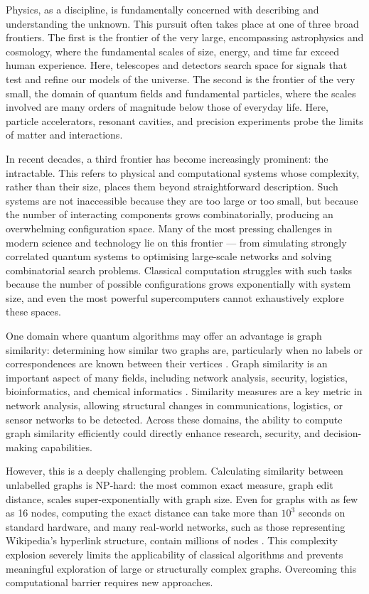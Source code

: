 Physics, as a discipline, is fundamentally concerned with describing and understanding the unknown. This pursuit often takes place at one of three broad frontiers. The first is the frontier of the very large, encompassing astrophysics and cosmology, where the fundamental scales of size, energy, and time far exceed human experience. Here, telescopes and detectors search space for signals that test and refine our models of the universe. The second is the frontier of the very small, the domain of quantum fields and fundamental particles, where the scales involved are many orders of magnitude below those of everyday life. Here, particle accelerators, resonant cavities, and precision experiments probe the limits of matter and interactions.

In recent decades, a third frontier has become increasingly prominent: the intractable. This refers to physical and computational systems whose complexity, rather than their size, places them beyond straightforward description. Such systems are not inaccessible because they are too large or too small, but because the number of interacting components grows combinatorially, producing an overwhelming configuration space. Many of the most pressing challenges in modern science and technology lie on this frontier — from simulating strongly correlated quantum systems to optimising large-scale networks and solving combinatorial search problems. Classical computation struggles with such tasks because the number of possible configurations grows exponentially with system size, and even the most powerful supercomputers cannot exhaustively explore these spaces.

One domain where quantum algorithms may offer an advantage is graph similarity: determining how similar two graphs are, particularly when no labels or correspondences are known between their vertices \cite{how_similar}. Graph similarity is an important aspect of many fields, including network analysis, security, logistics, bioinformatics, and chemical informatics \cite{web-anomalies,traffic,bio-informatics,chem-informatics}.  Similarity measures are a key metric in network analysis, allowing structural changes in communications, logistics, or sensor networks to be detected. Across these domains, the ability to compute graph similarity efficiently could directly enhance research, security, and decision-making capabilities.

However, this is a deeply challenging problem. Calculating similarity between unlabelled graphs is NP-hard: the most common exact measure, graph edit distance, scales super-exponentially with graph size. Even for graphs with as few as 16 nodes, computing the exact distance can take more than $10^3$ seconds on standard hardware, and many real-world networks, such as those representing Wikipedia's hyperlink structure, contain millions of nodes \cite{GED,GED_hard}. This complexity explosion severely limits the applicability of classical algorithms and prevents meaningful exploration of large or structurally complex graphs. Overcoming this computational barrier requires new approaches.

